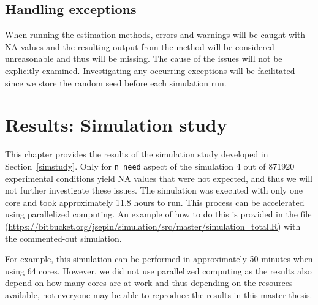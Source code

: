 \documentclass[11pt,a4paper,twoside]{book}\usepackage[]{graphicx}\usepackage[]{xcolor}
\begin{document}
\section{Handling exceptions}\label{sec:sim_exceptions}

When running the estimation methods, errors and warnings will be caught with NA values and the resulting output from the method will be considered unreasonable and thus will be missing. The cause of the issues will not be explicitly examined. Investigating any occurring exceptions will be facilitated since we store the random seed before each simulation run.














\chapter{Results: Simulation study}\label{results}



This chapter provides the results of the simulation study developed in Section~\ref{simstudy}. Only for \texttt{n\_need} aspect of the simulation 4 out of 871920 experimental conditions yield NA values that were not expected, and thus we will not further investigate these issues. The simulation was executed with only one core and took approximately 11.8 hours to run.
This process can be accelerated using parallelized computing. An example of how to do this is provided in the file (\url{https://bitbucket.org/jsepin/simulation/src/master/simulation_total.R}) with the commented-out simulation.

For example, this simulation can be performed in approximately 50 minutes when using 64 cores.
However, we did not use parallelized computing as the results also depend on how many cores are at work and thus depending on the resources available, not everyone may be able to reproduce the results in this master thesis.
\end{document}
